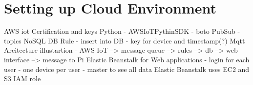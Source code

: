 \chapter{Setting up Cloud Environment}

AWS iot
Certification and keys
Python - AWSIoTPythinSDK - boto
PubSub - topics
NoSQL DB
Rule - insert into DB - key for device and timestamp(?)
Mqtt
Arcitecture illustartion - AWS IoT --> message queue --> rules --> db --> web interface --> message to Pi
Elastic Beanstalk for Web applications - login for each user - one device per user - master to see all data
Elastic Beanstalk uses EC2 and S3
IAM role